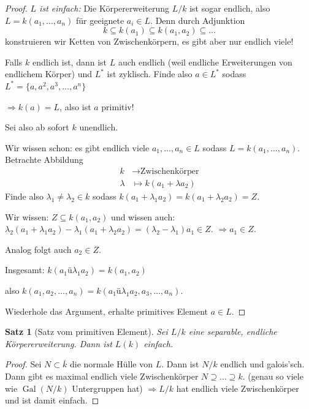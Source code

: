 \documentclass[a4paper,12pt,numbers=noenddot,parskip=full]{scrartcl}
\DeclareMathOperator{\Gal}{Gal}
\theoremstyle{dotless}
\newtheorem{theorem}{Satz}[section]
\theoremstyle{remark}
\begin{document}
\begin{proof}
		\textit{$L$ ist einfach:} Die Körpererweiterung $L/k$ ist sogar endlich, also $L = k(a_1, \dots, a_n)$ für geeignete $a_i \in L$. Denn durch Adjunktion
		\begin{equation*}
			k \subseteq k(a_1) \subseteq k(a_1, a_2) \subseteq \dots
		\end{equation*}
		konstruieren wir Ketten von Zwischenkörpern, es gibt aber nur endlich viele!
		
		Falls $k$ endlich ist, dann ist $L$ auch endlich (weil endliche Erweiterungen von endlichem Körper) und $L^*$ ist zyklisch. Finde also $a \in L^*$ sodass $L^* = \{ a, a^2, a^3, \dots, a^n \}$
		
		$\Rightarrow k(a) = L$, also ist $a$ primitiv!
		
		Sei also ab sofort $k$ unendlich.
		
		Wir wissen schon: es gibt endlich viele $a_1, \dots, a_n \in L$ sodass $L = k(a_1, \dots, a_n)$. Betrachte Abbildung
		\begin{align*}
			k &\longrightarrow \text{Zwischenkörper} \\
			\lambda &\longmapsto k(a_1 + \lambda a_2)
		\end{align*}
		Finde also $\lambda_1 \neq \lambda_2 \in k$ sodass $k(a_1 + \lambda_1 a_2) = k(a_1 + \lambda_2 a_2) = Z$.
		
		Wir wissen: $Z \subseteq k(a_1, a_2)$ und wissen auch: $\lambda_2(a_1 + \lambda_1 a_2) - \lambda_1(a_1 + \lambda_2 a_2) = (\lambda_2 - \lambda_1) a_1 \in Z$. $\Rightarrow a_1 \in Z$.
		
		Analog folgt auch $a_2 \in Z$.
		
		Insgesamt: $k(a_1 ü \lambda_1 a_2) = k(a_1, a_2)$
		
		also $k(a_1, a_2, \dots, a_n) = k(a_1 ü \lambda_1 a_2, a_3, \dots, a_n)$.
		
		Wiederhole das Argument, erhalte primitives Element $a \in L$.
	\end{proof}

	\begin{theorem}[Satz vom primitiven Element]
		Sei $L/k$ eine separable, endliche Körpererweiterung. Dann ist $L(k)$ einfach.
	\end{theorem}

	\begin{proof}
		Sei $N \subset \overline{k}$ die normale Hülle von $L$. Dann ist $N/k$ endlich und galois'sch. Dann gibt es maximal endlich viele Zwischenkörper $N \supseteq \dots \supseteq k$. (genau so viele wie $\Gal(N/k)$ Untergruppen hat) $\Rightarrow L/k$ hat endlich viele Zwischenkörper und ist damit einfach.
	\end{proof}
\end{document}
